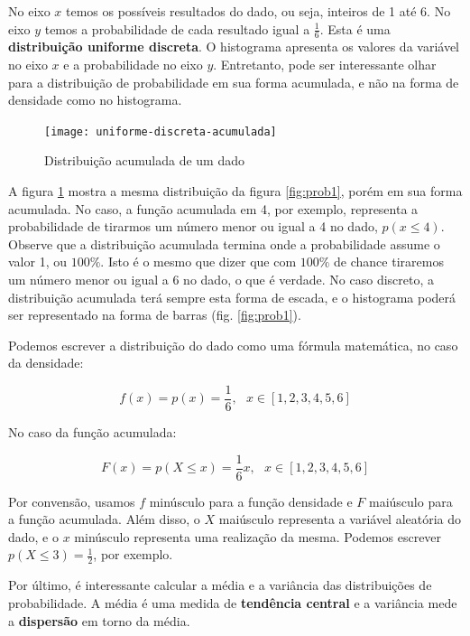 No eixo $x$ temos os possíveis resultados do dado, ou seja, inteiros de 1 até 6. No eixo $y$ temos a probabilidade de cada resultado igual a $\frac{1}{6}$. Esta é uma \textbf{distribuição uniforme discreta}. O histograma apresenta os valores da variável no eixo $x$ e a probabilidade no eixo $y$. Entretanto, pode ser interessante olhar para a distribuição de probabilidade em sua forma acumulada, e não na forma de densidade como no histograma. 

\begin{figure}[H]
\begin{centering}
\texttt{[image: uniforme-discreta-acumulada]}\protect\caption{\label{fig:prob2}Distribuição acumulada de um dado}
\end{centering}
\end{figure}

A figura \ref{fig:prob2} mostra a mesma distribuição da figura \ref{fig:prob1}, porém em sua forma acumulada. No caso, a função acumulada em 4, por exemplo, representa a probabilidade de tirarmos um número menor ou igual a 4 no dado, $p(x\leq4)$. Observe que a distribuição acumulada termina onde a probabilidade assume o valor 1, ou $100\%$. Isto é o mesmo que dizer que com $100\%$ de chance tiraremos um número menor ou igual a 6 no dado, o que é verdade. No caso discreto, a distribuição acumulada terá sempre esta forma de escada, e o histograma poderá ser representado na forma de barras (fig. \ref{fig:prob1}).


Podemos escrever a distribuição do dado como uma fórmula matemática, no caso da densidade:

\begin{equation}
f(x)=p(x)=\frac{1}{6},~~~x\in [1,2,3,4,5,6]
\end{equation}

No caso da função acumulada:

\begin{equation}
F(x)=p(X\leq x)=\frac{1}{6}x,~~~x\in [1,2,3,4,5,6]
\end{equation}

Por convensão, usamos $f$ minúsculo para a função densidade e $F$ maiúsculo para a função acumulada. Além disso, o $X$ maiúsculo representa a variável aleatória do dado, e o $x$ minúsculo representa uma realização da mesma. Podemos escrever $p(X\leq 3)=\frac{1}{2}$, por exemplo. 

Por último, é interessante calcular a média e a variância das distribuições de probabilidade. A média é uma medida de \textbf{tendência central} e a variância mede a \textbf{dispersão} em torno da média. 

